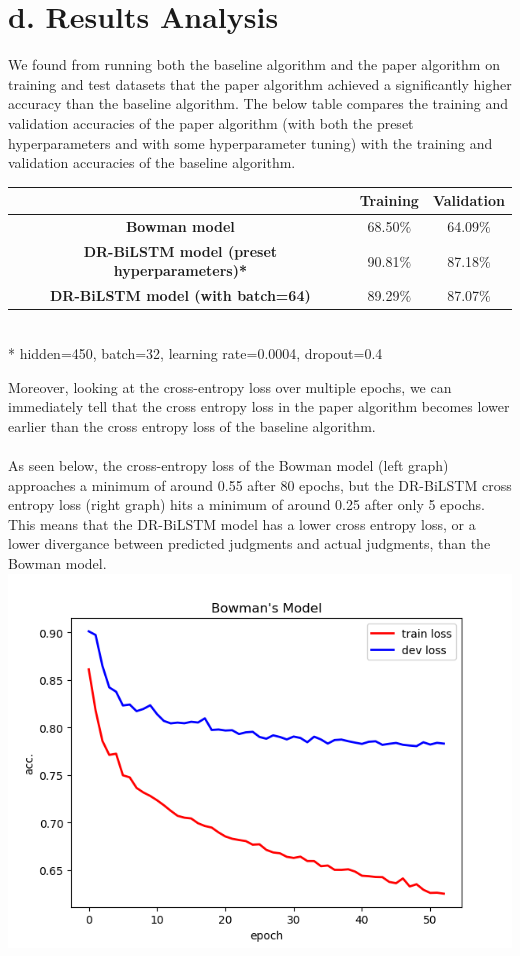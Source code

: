 \documentclass[12pt,letterpaper]{article}
\begin{document}
\section*{d. Results Analysis}
We found from running both the baseline algorithm and the paper algorithm on training and test datasets that the paper algorithm achieved a significantly higher accuracy than the baseline algorithm. The below table compares the training and validation accuracies of the paper algorithm (with both the preset hyperparameters and with some hyperparameter tuning) with the training and validation accuracies of the baseline algorithm. 
\begin{center}
    \begin{tabular}{| c | c | c |}
        \hline
         & \textbf{Training} & \textbf{Validation}\\ \hline
        \textbf{Bowman model} & 68.50$\%$ & 64.09$\%$
        \\ \hline
        \textbf{DR-BiLSTM model (preset hyperparameters)*} & 90.81$\%$ & 87.18$\%$\\ \hline
        \textbf{DR-BiLSTM model (with batch=64)} & 89.29$\%$ & 87.07$\%$\\ \hline
    \end{tabular} \\
    * hidden=450, batch=32, learning rate=0.0004, dropout=0.4 \\
\end{center}
Moreover, looking at the cross-entropy loss over multiple epochs, we can immediately tell that the cross entropy loss in the paper algorithm becomes lower earlier than the cross entropy loss of the baseline algorithm. \\
\\
As seen below, the cross-entropy loss of the Bowman model (left graph) approaches a minimum of around 0.55 after 80 epochs, but the DR-BiLSTM cross entropy loss (right graph) hits a minimum of around 0.25 after only 5 epochs. This means that the DR-BiLSTM model has a lower cross entropy loss, or a lower divergance between predicted judgments and actual judgments, than the Bowman model.\\
\includegraphics[scale=0.53]{Bowmanxent.PNG}
\end{document}
